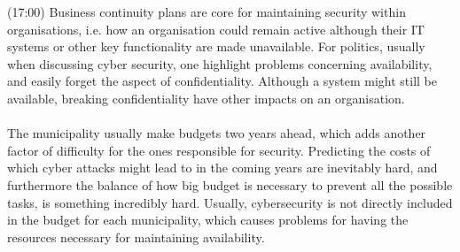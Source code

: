 \documentclass{article}
\begin{document}
(17:00) Business continuity plans are core for maintaining security within organisations, i.e. how an organisation could remain active although their IT systems or other key functionality are made unavailable.
For politics, usually when discussing cyber security, one highlight problems concerning availability, and easily forget the aspect of confidentiality.
Although a system might still be available, breaking confidentiality have other impacts on an organisation.
\\
\\
The municipality usually make budgets two years ahead, which adds another factor of difficulty for the ones responsible for security.
Predicting the costs of which cyber attacks might lead to in the coming years are inevitably hard, and furthermore the balance of how big budget is necessary to prevent all the possible tasks, is something incredibly hard.
Usually, cybersecurity is not directly included in the budget for each municipality, which causes problems for having the resources necessary for maintaining availability.
\end{document}
